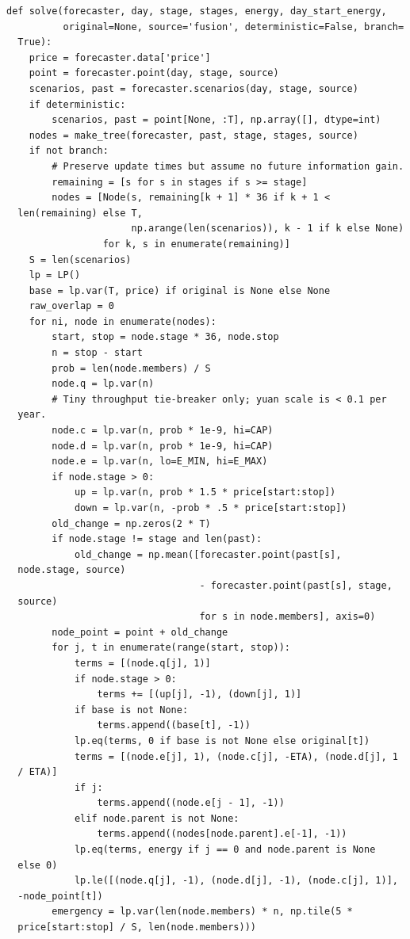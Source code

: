 \begin{verbatim}
def solve(forecaster, day, stage, stages, energy, day_start_energy,
          original=None, source='fusion', deterministic=False, branch=
  True):
    price = forecaster.data['price']
    point = forecaster.point(day, stage, source)
    scenarios, past = forecaster.scenarios(day, stage, source)
    if deterministic:
        scenarios, past = point[None, :T], np.array([], dtype=int)
    nodes = make_tree(forecaster, past, stage, stages, source)
    if not branch:
        # Preserve update times but assume no future information gain.
        remaining = [s for s in stages if s >= stage]
        nodes = [Node(s, remaining[k + 1] * 36 if k + 1 <
  len(remaining) else T,
                      np.arange(len(scenarios)), k - 1 if k else None)
                 for k, s in enumerate(remaining)]
    S = len(scenarios)
    lp = LP()
    base = lp.var(T, price) if original is None else None
    raw_overlap = 0
    for ni, node in enumerate(nodes):
        start, stop = node.stage * 36, node.stop
        n = stop - start
        prob = len(node.members) / S
        node.q = lp.var(n)
        # Tiny throughput tie-breaker only; yuan scale is < 0.1 per
  year.
        node.c = lp.var(n, prob * 1e-9, hi=CAP)
        node.d = lp.var(n, prob * 1e-9, hi=CAP)
        node.e = lp.var(n, lo=E_MIN, hi=E_MAX)
        if node.stage > 0:
            up = lp.var(n, prob * 1.5 * price[start:stop])
            down = lp.var(n, -prob * .5 * price[start:stop])
        old_change = np.zeros(2 * T)
        if node.stage != stage and len(past):
            old_change = np.mean([forecaster.point(past[s],
  node.stage, source)
                                  - forecaster.point(past[s], stage,
  source)
                                  for s in node.members], axis=0)
        node_point = point + old_change
        for j, t in enumerate(range(start, stop)):
            terms = [(node.q[j], 1)]
            if node.stage > 0:
                terms += [(up[j], -1), (down[j], 1)]
            if base is not None:
                terms.append((base[t], -1))
            lp.eq(terms, 0 if base is not None else original[t])
            terms = [(node.e[j], 1), (node.c[j], -ETA), (node.d[j], 1
  / ETA)]
            if j:
                terms.append((node.e[j - 1], -1))
            elif node.parent is not None:
                terms.append((nodes[node.parent].e[-1], -1))
            lp.eq(terms, energy if j == 0 and node.parent is None
  else 0)
            lp.le([(node.q[j], -1), (node.d[j], -1), (node.c[j], 1)],
  -node_point[t])
        emergency = lp.var(len(node.members) * n, np.tile(5 *
  price[start:stop] / S, len(node.members)))

\end{verbatim}
